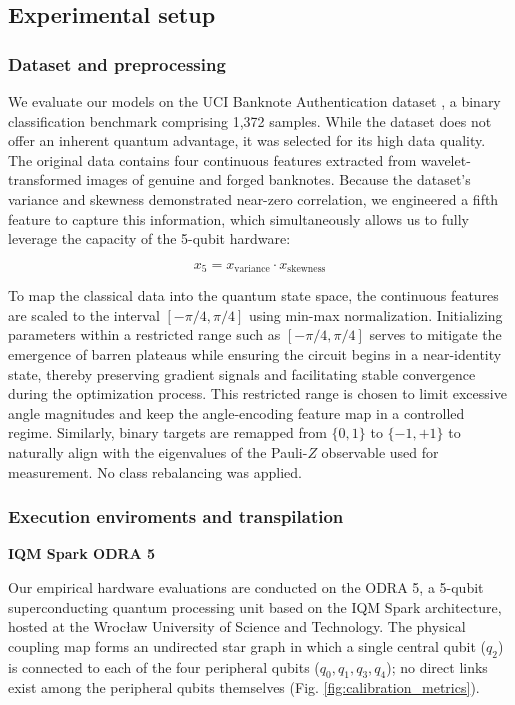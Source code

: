 \documentclass[11pt]{article}
\begin{document}
\subsection{Experimental setup}
\subsubsection{Dataset and preprocessing}

We evaluate our models on the UCI Banknote Authentication dataset \cite{ucibanknote}, a binary classification benchmark comprising 1,372 samples. While the dataset does not offer an inherent quantum advantage, it was selected for its high data quality. The original data contains four continuous features extracted from wavelet-transformed images of genuine and forged banknotes. Because the dataset's variance and skewness demonstrated near-zero correlation,  we engineered a fifth feature to capture this information, which simultaneously allows us to fully leverage the capacity of the 5-qubit hardware:

\begin{equation}
x_5 = x_{\mathrm{variance}} \cdot x_{\mathrm{skewness}}
\end{equation}


To map the classical data into the quantum state space, the continuous features are scaled to the interval $[-\pi/4,\pi/4]$ using min-max normalization. Initializing parameters within a restricted range such as $[-\pi/4,\pi/4]$ serves to mitigate the emergence of barren plateaus while ensuring the circuit begins in a near-identity state, thereby preserving gradient signals and facilitating stable convergence during the optimization process. This restricted range is chosen to limit excessive angle magnitudes and keep the angle-encoding feature map in a controlled regime. Similarly, binary targets are remapped from $\{0,1\}$ to $\{-1,+1\}$ to naturally align with the eigenvalues of the Pauli-$Z$ observable used for measurement. No class rebalancing was applied.



\subsubsection{Execution enviroments and transpilation}




\textbf{IQM Spark ODRA 5}

Our empirical hardware evaluations are conducted on the ODRA 5, a 5-qubit superconducting quantum processing unit based on the IQM Spark architecture, hosted at the Wrocław University of Science and Technology. The physical coupling map forms an undirected star graph in which a single central qubit (\(q_2\)) is connected to each of the four peripheral qubits (\(q_0, q_1, q_3, q_4\)); no direct links exist among the peripheral qubits themselves (Fig. \ref{fig:calibration_metrics}).
\end{document}
